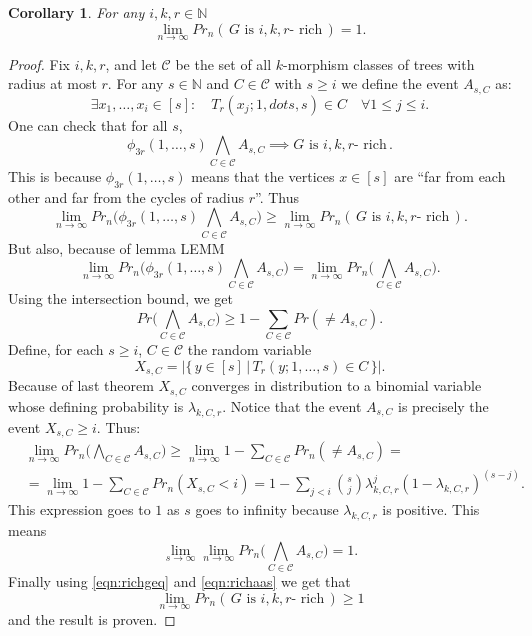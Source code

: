 \documentclass[11pt,notitlepage]{report}
\newtheorem{corollary}{Corollary}[chapter]
\theoremstyle{definition}
\newcommand{\N}{\mathbb{N}}
\newcommand{\Ln}{\lim\limits_{n\to \infty}}
\begin{document}
\begin{corollary} \label{thm:rich}
	For any $i,k,r\in \N$
	\[\Ln Pr_n(\, G \text{ is } i,k,r\text{- rich}\,)=1.\]
\end{corollary}
\begin{proof}
	Fix $i,k,r$, and let $\mathcal{C}$ be the set of all
	$k$-morphism classes of trees with radius at most $r$.
	For any $s\in \N$ and $C\in \mathcal{C}$ with $s\geq i$ we define
	the event $A_{s,C}$ as:
	\[ \exists x_1, \dots, x_i \in [s]: \quad T_r(x_j;1,dots, s)\in C \quad
	\forall 1\leq j \leq i.\] 
	One can check that for all $s$, 
	\[ \phi_{3r}(1,\dots, s) \bigwedge_{C\in \mathcal{C}} A_{s,C}
	\implies  G \text{ is } i,k,r\text{- rich}\, .\]
	This is because  $\phi_{3r}(1,\dots, s)$ means that the
	vertices $x\in [s]$ are ``far from each other and far from 
	the cycles of radius $r$''. Thus
	\begin{equation}\label{eqn:richgeq}
	\Ln Pr_n\Bigg(\phi_{3r}(1,\dots, s) 
	\bigwedge_{C\in \mathcal{C}} A_{s,C}\Bigg)
	\geq \Ln Pr_n(\, G \text{ is } i,k,r\text{- rich}\,).
	\end{equation}
	But also, because of lemma LEMM
	\begin{equation} \label{eqn:richaas}
	\Ln Pr_n\Bigg(\phi_{3r}(1,\dots, s) 
	\bigwedge_{C\in \mathcal{C}} A_{s,C}\Bigg)=
	\Ln Pr_n\Bigg( 
	\bigwedge_{C\in \mathcal{C}} A_{s,C}\Bigg).
	\end{equation}
	Using the intersection bound, we get
	\[ Pr\Bigg( 
	\bigwedge_{C\in \mathcal{C}} A_{s,C}\Bigg)\geq
	1- \sum_{C\in\mathcal{C}} Pr(\neq A_{s,C}).\]
	Define, for each $s\geq i$, $C\in \mathcal{C}$ the
	random variable
	\[ X_{s,C}=|\{ \, y\in [s] \, | \, T_r(y; 1,\dots, s)\in C \,   \}|.\]
	Because of last theorem $X_{s,C}$ converges in distribution
	to a binomial variable whose defining probability is $\lambda_{k,C,r}$. 
	Notice that the event $A_{s,C}$ is precisely the event
	$X_{s,C}\geq i$. Thus:
	\begin{align*}
	 &\Ln Pr_n\Bigg( 
	\bigwedge_{C\in \mathcal{C}} A_{s,C}\Bigg)\geq
	\Ln 1- \sum_{C\in\mathcal{C}} Pr_n(\neq A_{s,C})=\\
	&=\Ln 1- \sum_{C\in\mathcal{C}} Pr_n(X_{s,C}<i)=
	1- \sum_{j<i} \binom{s}{j}\lambda_{k,C,r}^j(1-\lambda_{k,C,r})^{(s-j)}.
	\end{align*}
	This expression goes to $1$ as $s$ goes to infinity because
	$\lambda_{k,C,r}$ is positive. This means 
	\[ \lim\limits_{s\to \infty} \Ln Pr_n\Bigg( 
	\bigwedge_{C\in \mathcal{C}} A_{s,C}\Bigg)=1. \]
	Finally using \cref{eqn:richgeq} and \cref{eqn:richaas} 
	we get that 
	\[\Ln Pr_n(\, G \text{ is } i,k,r\text{- rich}\,)\geq 1\]
	and the result is proven.
\end{proof}
\end{document}
